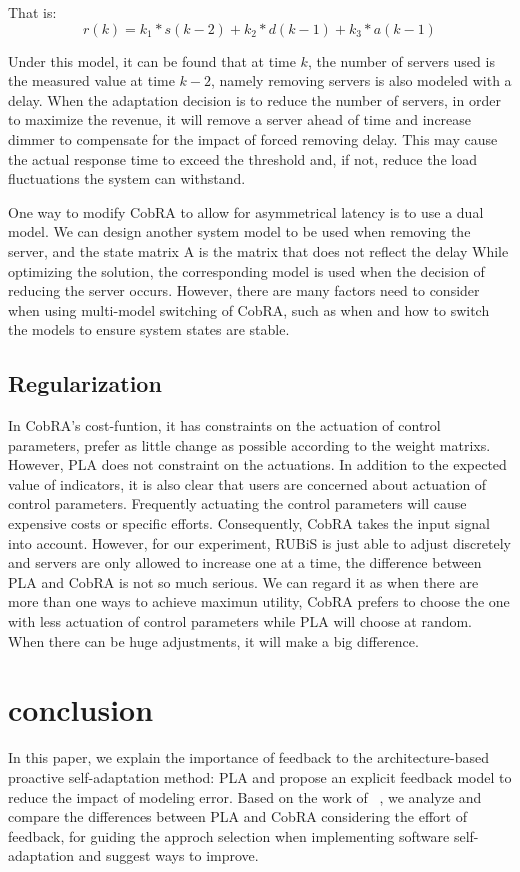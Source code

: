 \documentclass[sigconf]{acmart}
\begin{document}
	\noindent That is: 
	\begin{equation}
	r(k)=k_1 *s(k-2)+k_2 *d(k-1)+k_3*a(k-1)
	\end{equation}
	
	Under this model, it can be found that at time $k$, the number of servers used is the measured value at time $k-2$, namely removing servers is also modeled with a delay. When the adaptation decision is to reduce the number of servers, in order to maximize the revenue, it will remove a server ahead of time and increase dimmer to compensate for the impact of  forced removing delay. This may cause the actual response time to exceed the threshold and, if not, reduce the load fluctuations the system can withstand.
	
	One way to modify CobRA to allow for asymmetrical latency is to use a dual model. We can design another system model to be used when removing the server, and the state matrix A is the matrix that does not reflect the delay While optimizing the solution, the corresponding model is used when the decision of reducing the server occurs. 
	However, there are many factors need to consider when using multi-model switching of CobRA, such as when and how to switch the models to ensure system states are stable. 
	
	\subsection{Regularization}
	In CobRA's cost-funtion, it has constraints on the actuation of control parameters, prefer as little change as possible according to the weight matrixs. However, PLA does not constraint on the actuations. In addition to the expected value of indicators, it is also clear that users are concerned about actuation of control parameters. Frequently actuating the control parameters will cause expensive costs or specific efforts. Consequently, CobRA takes the input signal into account. However, for our experiment, RUBiS is just able to adjust discretely and servers are only allowed to increase one at a time, the difference between PLA and CobRA is not so much serious. We can regard it as when there are more than one ways to achieve maximun utility, CobRA prefers to choose the one with less actuation of control parameters while PLA will choose at random. When there can be huge adjustments, it will make a big difference.
	
	\section{conclusion}
	In this paper, we explain the importance of feedback to the architecture-based proactive self-adaptation method: PLA and propose an explicit feedback model to reduce the impact of modeling error. 
	Based on the work of ~\cite{moreno2017comparing}, we analyze and compare the differences between PLA and CobRA considering the effort of feedback, for guiding the approch selection when implementing software self-adaptation and suggest ways to improve.
	
\end{document}
